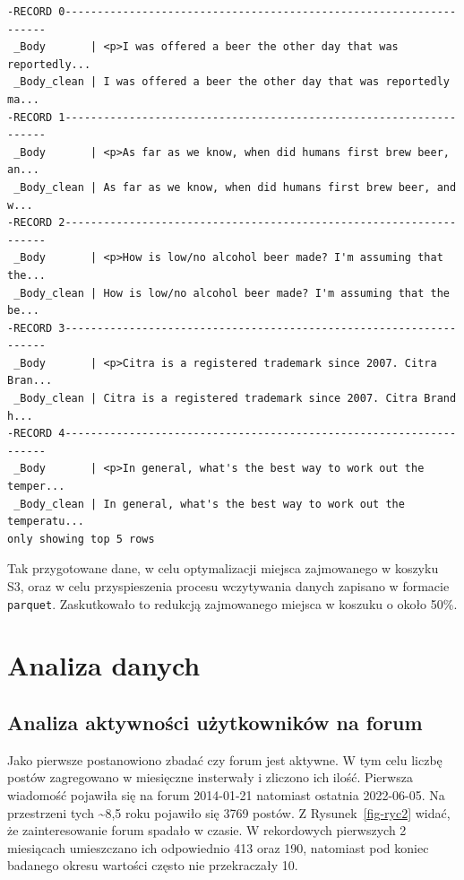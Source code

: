 \documentclass[
  letterpaper,
  DIV=11,
  numbers=noendperiod]{scrreprt}
\begin{document}
\begin{verbatim}
-RECORD 0-------------------------------------------------------------------
 _Body       | <p>I was offered a beer the other day that was reportedly... 
 _Body_clean | I was offered a beer the other day that was reportedly ma... 
-RECORD 1-------------------------------------------------------------------
 _Body       | <p>As far as we know, when did humans first brew beer, an... 
 _Body_clean | As far as we know, when did humans first brew beer, and w... 
-RECORD 2-------------------------------------------------------------------
 _Body       | <p>How is low/no alcohol beer made? I'm assuming that the... 
 _Body_clean | How is low/no alcohol beer made? I'm assuming that the be... 
-RECORD 3-------------------------------------------------------------------
 _Body       | <p>Citra is a registered trademark since 2007. Citra Bran... 
 _Body_clean | Citra is a registered trademark since 2007. Citra Brand h... 
-RECORD 4-------------------------------------------------------------------
 _Body       | <p>In general, what's the best way to work out the temper... 
 _Body_clean | In general, what's the best way to work out the temperatu... 
only showing top 5 rows
\end{verbatim}

Tak przygotowane dane, w celu optymalizacji miejsca zajmowanego w
koszyku S3, oraz w celu przyspieszenia procesu wczytywania danych
zapisano w formacie \texttt{parquet}. Zaskutkowało to redukcją
zajmowanego miejsca w koszuku o około 50\%. \normalsize \small

\normalsize

\hypertarget{analiza-danych}{%
\chapter{Analiza danych}\label{analiza-danych}}

\hypertarget{analiza-aktywnoux15bci-uux17cytkownikuxf3w-na-forum}{%
\section{Analiza aktywności użytkowników na
forum}\label{analiza-aktywnoux15bci-uux17cytkownikuxf3w-na-forum}}

Jako pierwsze postanowiono zbadać czy forum jest aktywne. W tym celu
liczbę postów zagregowano w miesięczne insterwały i zliczono ich ilość.
Pierwsza wiadomość pojawiła się na forum 2014-01-21 natomiast ostatnia
2022-06-05. Na przestrzeni tych \textasciitilde8,5 roku pojawiło się
3769 postów. Z Rysunek~\ref{fig-ryc2} widać, że zainteresowanie forum
spadało w czasie. W rekordowych pierwszych 2 miesiącach umieszczano ich
odpowiednio 413 oraz 190, natomiast pod koniec badanego okresu wartości
często nie przekraczały 10.
\end{document}
